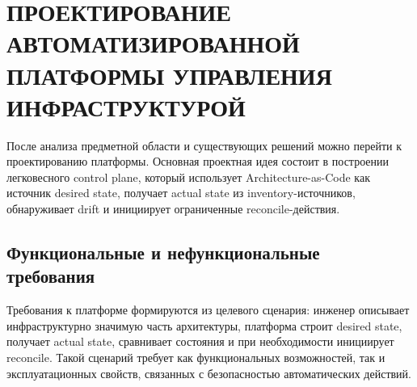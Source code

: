 \section{ПРОЕКТИРОВАНИЕ АВТОМАТИЗИРОВАННОЙ ПЛАТФОРМЫ УПРАВЛЕНИЯ ИНФРАСТРУКТУРОЙ}

После анализа предметной области и существующих решений можно перейти к проектированию платформы. Основная проектная идея состоит в построении легковесного control plane, который использует Architecture-as-Code как источник desired state, получает actual state из inventory-источников, обнаруживает drift и инициирует ограниченные reconcile-действия.

\subsection{Функциональные и нефункциональные требования}

Требования к платформе формируются из целевого сценария: инженер описывает инфраструктурно значимую часть архитектуры, платформа строит desired state, получает actual state, сравнивает состояния и при необходимости инициирует reconcile. Такой сценарий требует как функциональных возможностей, так и эксплуатационных свойств, связанных с безопасностью автоматических действий.

